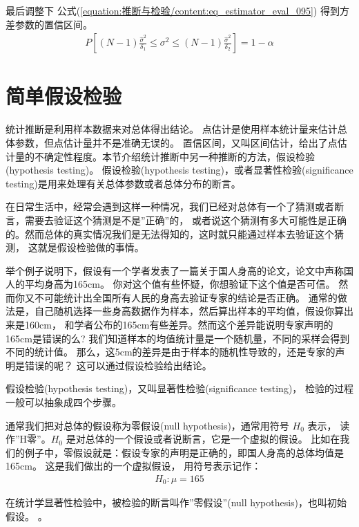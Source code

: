 \documentclass[letterpaper,10pt,english]{sphinxmanual}
\begin{document}
最后调整下 公式(\ref{equation:推断与检验/content:eq_estimator_eval_095}) 得到方差参数的置信区间。
\begin{equation}\label{equation:推断与检验/content:eq_estimator_eval_096}
\begin{split}P \left [  (N-1) \frac{\hat{\sigma}^2}{\delta_1} \leq \sigma^2 \leq  (N-1) \frac{\hat{\sigma}^2}{\delta_2} \right ] = 1-\alpha\end{split}
\end{equation}

\section{简单假设检验}
\label{\detokenize{_u63a8_u65ad_u4e0e_u68c0_u9a8c/content:id21}}
统计推断是利用样本数据来对总体得出结论。
点估计是使用样本统计量来估计总体参数，但点估计量并不是准确无误的。
置信区间，又叫区间估计，给出了点估计量的不确定性程度。本节介绍统计推断中另一种推断的方法，假设检验(hypothesis testing)。
假设检验(hypothesis testing)，或者显著性检验(significance testing)是用来处理有关总体参数或者总体分布的断言。

在日常生活中，经常会遇到这样一种情况，我们已经对总体有一个了猜测或者断言，需要去验证这个猜测是不是”正确”的，
或者说这个猜测有多大可能性是正确的。然而总体的真实情况我们是无法得知的，这时就只能通过样本去验证这个猜测，
这就是假设检验做的事情。

举个例子说明下，假设有一个学者发表了一篇关于国人身高的论文，论文中声称国人的平均身高为165cm。
你对这个值有些怀疑，你想验证下这个值是否可信。
然而你又不可能统计出全国所有人民的身高去验证专家的结论是否正确。
通常的做法是，自己随机选择一些身高数据作为样本，然后算出样本的平均值，假设你算出来是160cm，
和学者公布的165cm有些差异。然而这个差异能说明专家声明的165cm是错误的么?
我们知道样本的均值统计量是一个随机量，不同的采样会得到不同的统计值。
那么，这5cm的差异是由于样本的随机性导致的，还是专家的声明是错误的呢？
这可以通过假设检验给出结论。

假设检验(hypothesis testing)，又叫显著性检验(significance testing)，
检验的过程一般可以抽象成四个步骤。


通常我们把对总体的假设称为零假设(null hypothesis)，通常用符号 \(H_0\) 表示，
读作”H零”。\(H_0\) 是对总体的一个假设或者说断言，它是一个虚拟的假设。
比如在我们的例子中，零假设就是：假设专家的声明是正确的，即国人身高的总体均值是165cm。
这是我们做出的一个虚拟假设，
用符号表示记作：
\begin{equation}\label{equation:推断与检验/content:推断与检验/content:83}
\begin{split}H_0: \mu = 165\end{split}
\end{equation}
\begin{sphinxShadowBox}

在统计学显著性检验中，被检验的断言叫作”零假设”(null hypothesis)，也叫初始假设。
。
\end{sphinxShadowBox}
\end{document}
